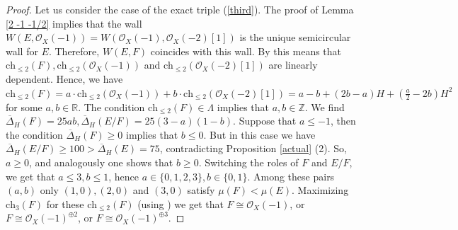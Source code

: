 \documentclass{amsart}
\begin{document}
\begin{proof}
	Let us consider the case of the exact triple (\ref{third}). The proof of Lemma \ref{2 -1 -1/2} implies that the wall $W(E,\mathcal O_X(-1))=W(\mathcal O_X(-1),\mathcal O_X(-2)[1])$ is the unique semicircular wall for $E$. Therefore, $W(E,F)$ coincides with this wall. By \cite[Theorem 2.9 (iii)]{Sch18} this means that $\mathrm{ch}_{\le 2}(F),\mathrm{ch}_{\le 2}(\mathcal O_X(-1))$ and $\mathrm{ch}_{\le 2}(\mathcal O_X(-2)[1])$ are linearly dependent. Hence, we have $\mathrm{ch}_{\le 2}(F)=a\cdot\mathrm{ch}_{\le 2}(\mathcal O_X(-1))+b\cdot\mathrm{ch}_{\le 2}(\mathcal O_X(-2)[1])=a-b+(2b-a)H+(\frac a2-2b)H^2$ for some $a,b\in\mathbb R$. The condition $\mathrm{ch}_{\le 2}(F)\in\Lambda$ implies that $a,b\in\mathbb Z$. We find $\overline{\Delta}_H(F)=25ab,\overline{\Delta}_H(E/F)=25(3-a)(1-b)$. Suppose that $a\le -1$, then the condition $\overline{\Delta}_H(F)\ge 0$ implies that $b\le 0$. But in this case we have $\overline{\Delta}_H(E/F)\ge 100>\overline{\Delta}_H(E)=75$, contradicting Proposition \ref{actual} (2). So, $a\ge 0$, and analogously one shows that $b\ge 0$. Switching the roles of $F$ and $E/F$, we get that $a\le 3,b\le 1$, hence $a\in\{0,1,2,3\},b\in\{0,1\}$. Among these pairs $(a,b)$ only $(1,0),(2,0)$ and $(3,0)$ satisfy $\mu(F)<\mu(E)$. Maximizing $\mathrm{ch}_3(F)$ for these $\mathrm{ch}_{\le 2}(F)$ (using \cite[Proposition 3.1]{Vass}) we get that $F\cong\mathcal O_X(-1)$, or $F\cong\mathcal O_X(-1)^{\oplus 2}$, or $F\cong\mathcal O_X(-1)^{\oplus 3}$.
	

\end{proof}
\end{document}
